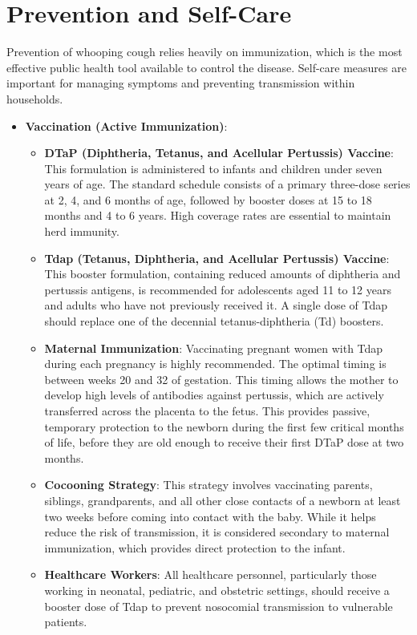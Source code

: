 \section*{Prevention and Self-Care}
Prevention of whooping cough relies heavily on immunization, which is the most effective public health tool available to control the disease. Self-care measures are important for managing symptoms and preventing transmission within households.
\begin{itemize}
    \item \textbf{Vaccination (Active Immunization)}:
    \begin{itemize}
        \item \textbf{DTaP (Diphtheria, Tetanus, and Acellular Pertussis) Vaccine}: This formulation is administered to infants and children under seven years of age. The standard schedule consists of a primary three-dose series at 2, 4, and 6 months of age, followed by booster doses at 15 to 18 months and 4 to 6 years. High coverage rates are essential to maintain herd immunity.
        \item \textbf{Tdap (Tetanus, Diphtheria, and Acellular Pertussis) Vaccine}: This booster formulation, containing reduced amounts of diphtheria and pertussis antigens, is recommended for adolescents aged 11 to 12 years and adults who have not previously received it. A single dose of Tdap should replace one of the decennial tetanus-diphtheria (Td) boosters.
        \item \textbf{Maternal Immunization}: Vaccinating pregnant women with Tdap during each pregnancy is highly recommended. The optimal timing is between weeks 20 and 32 of gestation. This timing allows the mother to develop high levels of antibodies against pertussis, which are actively transferred across the placenta to the fetus. This provides passive, temporary protection to the newborn during the first few critical months of life, before they are old enough to receive their first DTaP dose at two months.
        \item \textbf{Cocooning Strategy}: This strategy involves vaccinating parents, siblings, grandparents, and all other close contacts of a newborn at least two weeks before coming into contact with the baby. While it helps reduce the risk of transmission, it is considered secondary to maternal immunization, which provides direct protection to the infant.
        \item \textbf{Healthcare Workers}: All healthcare personnel, particularly those working in neonatal, pediatric, and obstetric settings, should receive a booster dose of Tdap to prevent nosocomial transmission to vulnerable patients.
    \end{itemize}


\end{itemize}

